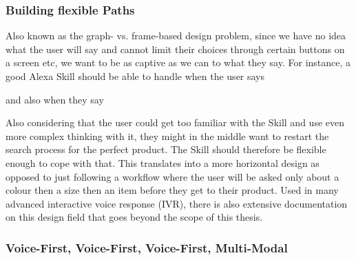 \subsubsection*{Building flexible Paths}
Also known as the graph- vs. frame-based design problem, since we have no idea what the user will say and cannot limit their choices through certain buttons on a screen etc, we want to be as captive as we can to what they say. For instance, a good Alexa Skill should be able to handle when the user says



\noindent and also when they say 



Also considering that the user could get too familiar with the Skill and use even more complex thinking with it, they might in the middle want to restart the search process for the perfect product. The Skill should therefore be flexible enough to cope with that. This translates into a more horizontal design as opposed to just following a workflow where the user will be asked only about a colour then a size then an item before they get to their product. Used in many advanced interactive voice response (IVR), there is also extensive documentation on this design field that goes beyond the scope of this thesis.



\subsubsection*{Voice-First, Voice-First, Voice-First, Multi-Modal}

